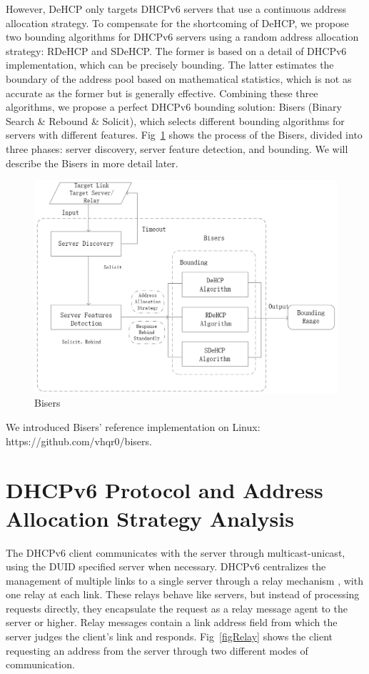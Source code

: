 \documentclass[conference]{IEEEtran}
\begin{document}
However, DeHCP only targets DHCPv6 servers that use a continuous
address allocation strategy. To compensate for the shortcoming of
DeHCP, we propose two bounding algorithms for DHCPv6 servers using a
random address allocation strategy: RDeHCP and SDeHCP. The former is
based on a detail of DHCPv6 implementation, which can be precisely
bounding. The latter estimates the boundary of the address pool based
on mathematical statistics, which is not as accurate as the former but
is generally effective. Combining these three algorithms, we propose a
perfect DHCPv6 bounding solution: Bisers (Binary Search \& Rebound \&
Solicit), which selects different bounding algorithms for servers with
different features. Fig~\ref{figBisers} shows the process of the
Bisers, divided into three phases: server discovery, server feature
detection, and bounding. We will describe the Bisers in more detail
later.

\begin{figure}[htbp]
  \centerline{\includegraphics[scale=0.5]{bisers.png}}
  \caption{Bisers}
  \label{figBisers}
\end{figure}

We introduced Bisers' reference implementation on Linux:
https://github.com/vhqr0/bisers.

\section{DHCPv6 Protocol and Address Allocation Strategy Analysis}

The DHCPv6 client communicates with the server through
multicast-unicast, using the DUID specified server when
necessary. DHCPv6 centralizes the management of multiple links to a
single server through a relay mechanism \cite{carney_dynamic_2003}
\cite{mrugalski_dynamic_2018}, with one relay at each link. These
relays behave like servers, but instead of processing requests
directly, they encapsulate the request as a relay message agent to the
server or higher. Relay messages contain a link address field from
which the server judges the client's link and
responds. Fig~\ref{figRelay} shows the client requesting an address
from the server through two different modes of communication.
\end{document}
